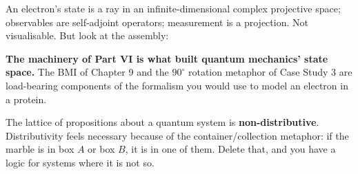 \begin{auditbox}[title={2. Hilbert space \normalfont(von Neumann, \textit{Mathematische Grundlagen der Quantenmechanik}, 1932)}]
An electron's state is a ray in an infinite-dimensional complex projective space; observables are
self-adjoint operators; measurement is a projection. Not visualisable. But look at the assembly:
\begin{center}
\end{center}
\vspace{-2pt}
\textbf{The machinery of Part VI is what built quantum mechanics' state space.} The BMI of Chapter 9
and the $90^{\circ}$ rotation metaphor of Case Study 3 are load-bearing components of the formalism
you would use to model an electron in a protein.
\end{auditbox}

\begin{auditbox}[title={3. Quantum logic \normalfont(Birkhoff \& von Neumann, \textit{Annals of Mathematics}, 1936)}]
The lattice of propositions about a quantum system is \textbf{non-distributive}. Distributivity feels
necessary because of the container/collection metaphor: if the marble is in box $A$ or box $B$, it is
in one of them. Delete that, and you have a logic for systems where it is not so.
\end{auditbox}

